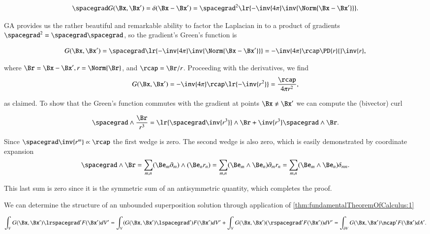 \begin{equation}\label{eqn:greensFunctionGradient:481}
\spacegrad G(\Bx, \Bx') = \delta( \Bx - \Bx' ) = \spacegrad^2 \lr{ -\inv{4\pi} \inv{ \Norm{\Bx - \Bx'} } }.
\end{equation}

GA provides us the rather beautiful and remarkable ability to factor the Laplacian in to a product of gradients \( \spacegrad^2 = \spacegrad \spacegrad \), so the gradient's Green's function is

\begin{dmath}\label{eqn:greensFunctionGradient:580}
G(\Bx, \Bx')
= \spacegrad \lr{ -\inv{4\pi} \inv{ \Norm{\Bx - \Bx'} } }
= -\inv{4\pi} \rcap \PD{r}{} \inv{r},
\end{dmath}

where \( \Br = \Bx - \Bx', r = \Norm{\Br} \), and \( \rcap = \Br/r \).  Proceeding with the derivatives, we find
\begin{dmath}\label{eqn:greensFunctionGradient:600}
G(\Bx, \Bx')
= -\inv{4\pi} \rcap \lr{ -\inv{r^2} }
= \frac{\rcap}{4 \pi r^2},
\end{dmath}

as claimed.  To show that the Green's function commutes with the gradient at points \( \Bx \ne \Bx' \) we can compute the (bivector) curl

\begin{dmath}\label{eqn:greensFunctionGradient:620}
\spacegrad \wedge \frac{\Br}{r^3}
=
\lr{ \spacegrad \inv{r^3}} \wedge \Br
+
\inv{r^3} \spacegrad \wedge \Br.
\end{dmath}

Since \( \spacegrad \inv{r^m} \propto \rcap \) the first wedge is zero.  The second wedge is also zero, which is easily demonstrated by coordinate expansion
\begin{dmath}\label{eqn:greensFunctionGradient:640}
\spacegrad \wedge \Br
=
\sum_{m,n} (\Be_m \partial_m) \wedge (\Be_n r_n)
=
\sum_{m,n} (\Be_m \wedge \Be_n) \partial_m r_n
=
\sum_{m,n} (\Be_m \wedge \Be_n) \delta_{m n}.
\end{dmath}

This last sum is zero since it is the symmetric sum of an antisymmetric quantity, which completes the proof.

We can determine the structure of an unbounded superposition solution through application of
\cref{thm:fundamentalTheoremOfCalculus:1}

\begin{dmath}\label{eqn:greensFunctionGradient:500}
\int_V G(\Bx, \Bx') \lrspacegrad' F(\Bx') dV'
=
\int_V (G(\Bx, \Bx') \lspacegrad') F(\Bx') dV'
+
\int_V G(\Bx, \Bx') (\rspacegrad' F(\Bx')) dV'
=
\int_{\partial V} G(\Bx, \Bx') \ncap' F(\Bx') dA'.
\end{dmath}

